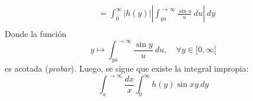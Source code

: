 \documentclass[12pt]{report}
\newcounter{it}
\theoremstyle{largebreak}
\newcommand\abs[1]{\ensuremath{\left|#1\right|}}
\begin{document}
\begin{sol}
\begin{equation*}
\begin{split}
                &=\int_0^{\infty}\abs{h(y)}\abs{\int_{ya}^{ \rightarrow\infty}\frac{\sin u}{u}\:du}\:dy\\
            \end{split}
        \end{equation*}
        Donde la función
        \begin{equation*}
            y\mapsto\int_{ ya}^{\rightarrow\infty}\frac{\sin y}{u}\:du,\quad\forall y\in[0,\infty[
        \end{equation*}
        es acotada (\textit{probar}). Luego, se sigue que existe la integral impropia:
        \begin{equation*}
            \int_{a}^{ \rightarrow\infty}\frac{dx}{x}\int_0^{\infty}h(y)\sin xy\:dy
        \end{equation*}


\end{sol}
\end{document}
